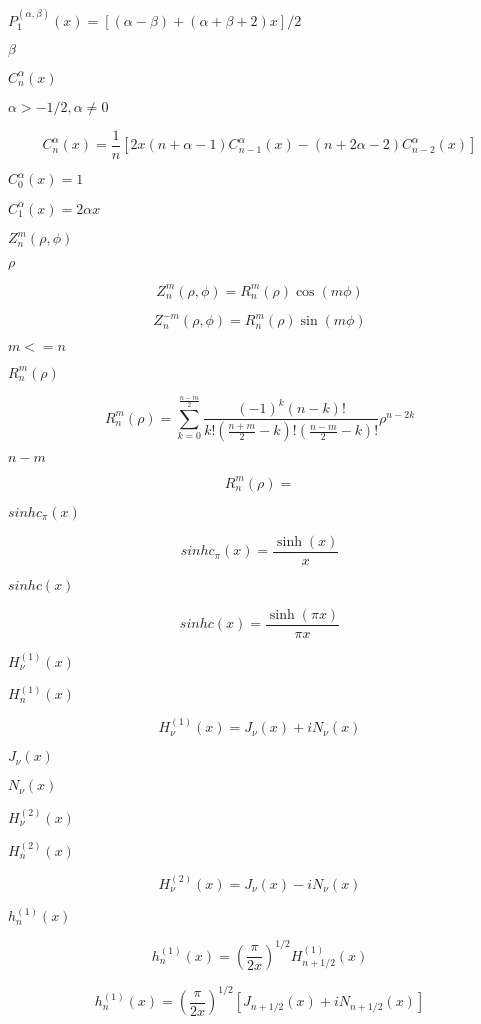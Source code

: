 \documentclass{article}
\begin{document}
$ P_1^{(\alpha,\beta)}(x) = [(\alpha - \beta) + (\alpha + \beta + 2) x] / 2 $
\pagebreak

$ \beta $
\pagebreak

$ C_n^{\alpha}(x) $
\pagebreak

$ \alpha > -1/2, \alpha \neq 0 $
\pagebreak

\[ C_n^{\alpha}(x) = \frac{1}{n}\left[ 2x(n+\alpha-1)C_{n-1}^{\alpha}(x) - (n+2\alpha-2)C_{n-2}^{\alpha}(x) \right] \]
\pagebreak

$ C_0^{\alpha}(x) = 1 $
\pagebreak

$ C_1^{\alpha}(x) = 2\alpha x $
\pagebreak

$ Z_n^m(\rho,\phi) $
\pagebreak

$ \rho $
\pagebreak

\[ Z_n^m(\rho,\phi) = R_n^m(\rho)\cos(m\phi) \]
\pagebreak

\[ Z_n^{-m}(\rho,\phi) = R_n^m(\rho)\sin(m\phi) \]
\pagebreak

$ m <= n $
\pagebreak

$ R_n^m(\rho) $
\pagebreak

\[ R_n^m(\rho) = \sum_{k=0}^{\frac{n-m}{2}} \frac{(-1)^k(n-k)!}{k!(\frac{n+m}{2}-k)!(\frac{n-m}{2}-k)!} \rho^{n-2k} \]
\pagebreak

$ n - m $
\pagebreak

\[ R_n^m(\rho) = \]
\pagebreak

$ sinhc_\pi(x) $
\pagebreak

\[ sinhc_\pi(x) = \frac{\sinh(x)}{x} \]
\pagebreak

$ sinhc(x) $
\pagebreak

\[ sinhc(x) = \frac{\sinh(\pi x)}{\pi x} \]
\pagebreak

$ H^{(1)}_\nu(x) $
\pagebreak

$ H^{(1)}_n(x) $
\pagebreak

\[ H^{(1)}_\nu(x) = J_\nu(x) + iN_\nu(x) \]
\pagebreak

$ J_\nu(x) $
\pagebreak

$ N_\nu(x) $
\pagebreak

$ H^{(2)}_\nu(x) $
\pagebreak

$ H^{(2)}_n(x) $
\pagebreak

\[ H^{(2)}_\nu(x) = J_\nu(x) - iN_\nu(x) \]
\pagebreak

$ h^{(1)}_n(x) $
\pagebreak

\[ h^{(1)}_n(x) = \left(\frac{\pi}{2x} \right) ^{1/2} H^{(1)}_{n+1/2}(x) \]
\pagebreak

\[ h^{(1)}_n(x) = \left(\frac{\pi}{2x} \right) ^{1/2} \left[ J_{n+1/2}(x) + iN_{n+1/2}(x) \right] \]
\pagebreak
\end{document}
